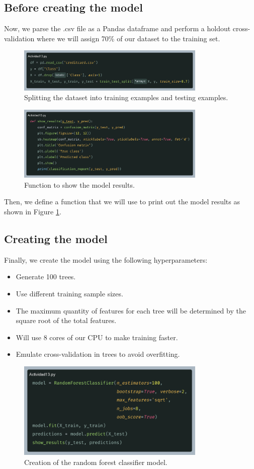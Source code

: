 \documentclass[10pt]{article}
\begin{document}
\subsection{Before creating the model}
Now, we parse the .csv file as a Pandas dataframe and perform a holdout cross-validation where we will assign 70\% of our dataset to the training set.
\begin{figure}[h]
    \centering
    \includegraphics[width=90mm]{2025-03-31-10-36-08.png}
    \caption{Splitting the dataset into training examples and testing examples.}
\end{figure}
\begin{figure}[h]
    \centering
    \includegraphics[width=90mm]{2025-03-31-10-39-22.png}
    \caption{Function to show the model results.}
    \label{fig:function}
\end{figure} \par
Then, we define a function that we will use to print out the model results as shown in Figure \ref{fig:function}.

\subsection{Creating the model}
Finally, we create the model using the following hyperparameters:
\begin{itemize}
    \item Generate 100 trees.
    \item Use different training sample sizes.
    \item The maximum quantity of features for each tree will be determined by the square root of the total features.
    \item Will use 8 cores of our CPU to make training faster.
    \item Emulate cross-validation in trees to avoid overfitting.
\end{itemize}
\begin{figure}[h]
    \centering
    \includegraphics[width=90mm]{2025-03-31-10-58-02.png}
    \caption{Creation of the random forest classifier model.}
\end{figure}
\end{document}
